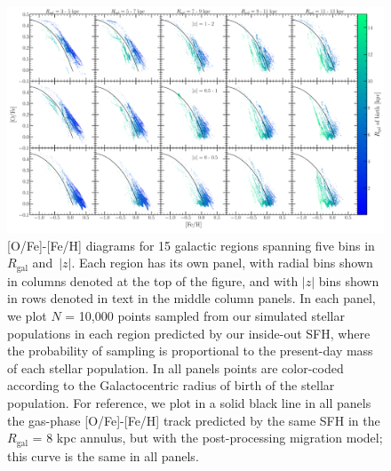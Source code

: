 \documentclass[a4paper, fleqn, usenatbib, useAMS]{mnras}
\begin{document}
\begin{figure} 
\centering 
\includegraphics[scale = 0.28]{ofe_feh_scatterplot_insideout.pdf} 
\caption{[O/Fe]-[Fe/H] diagrams for 15 galactic regions spanning five bins in 
$R_\text{gal}$ and~$\left|z\right|$. Each region has its own panel, with radial 
bins shown in columns denoted at the top of the figure, and with 
$\left|z\right|$ bins shown in rows denoted in text in the middle column 
panels. In each panel, we plot $N$ = 10,000 points sampled from our simulated 
stellar populations in each region predicted by our inside-out SFH, where the 
probability of sampling is proportional to the present-day mass of each stellar 
population. In all panels points are color-coded according to the 
Galactocentric radius of birth of the stellar population. For reference, we 
plot in a solid black line in all panels the gas-phase [O/Fe]-[Fe/H] track 
predicted by the same SFH in the $R_\text{gal}$ = 8 kpc annulus, but with the 
post-processing migration model; this curve is the same in all panels. }
\label{fig:ofe_feh_diagram} 
\end{figure} 
\end{document}
